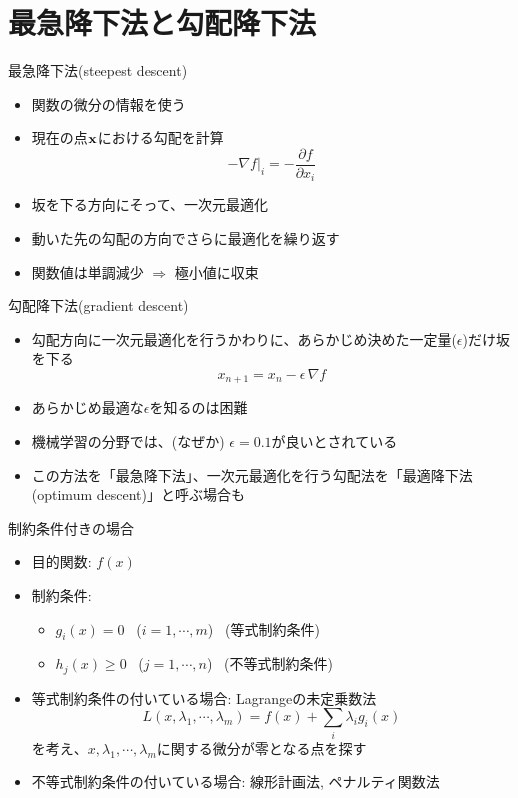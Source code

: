 \section{最急降下法と勾配降下法}

\begin{frame}[t,fragile]{最急降下法(steepest descent)}
  \begin{itemize}
    \setlength{\itemsep}{1em}
  \item 関数の微分の情報を使う
  \item 現在の点$\bf x$における勾配を計算
    \[
    -\nabla f|_i = -\frac{\partial f}{\partial x_i}
    \]
  \item 坂を下る方向にそって、一次元最適化
  \item 動いた先の勾配の方向でさらに最適化を繰り返す
  \item 関数値は単調減少 $\Rightarrow$ 極小値に収束
  \end{itemize}
\end{frame}

\begin{frame}[t,fragile]{勾配降下法(gradient descent)}
  \begin{itemize}
    \setlength{\itemsep}{1em}
  \item 勾配方向に一次元最適化を行うかわりに、あらかじめ決めた一定量($\epsilon$)だけ坂を下る
    \[
    x_{n+1} = x_n - \epsilon \, \nabla f
    \]
  \item あらかじめ最適な$\epsilon$を知るのは困難
  \item 機械学習の分野では、(なぜか) $\epsilon=0.1$が良いとされている
  \item この方法を「最急降下法」、一次元最適化を行う勾配法を「最適降下法(optimum descent)」と呼ぶ場合も
  \end{itemize}
\end{frame}

\begin{frame}[t,fragile]{制約条件付きの場合}
  \begin{itemize}
  \item 目的関数: $f(x)$
  \item 制約条件:
    \begin{itemize}
    \item $g_i(x) = 0$ \ ($i=1,\cdots,m$) \ (等式制約条件)
    \item $h_j(x) \ge 0$ \ ($j=1,\cdots,n$) \ (不等式制約条件)
    \end{itemize}
  \item 等式制約条件の付いている場合: Lagrangeの未定乗数法
    \[
    L(x,\lambda_1,\cdots,\lambda_m)=f(x)+\sum_i \lambda_i g_i(x)
    \]
    を考え、$x,\lambda_1,\cdots,\lambda_m$に関する微分が零となる点を探す
  \item 不等式制約条件の付いている場合: 線形計画法, ペナルティ関数法
  \end{itemize}
\end{frame}

